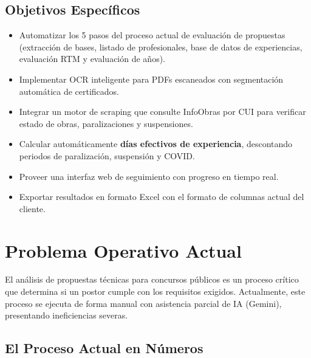 \documentclass[11pt,a4paper]{article}
\begin{document}
\subsection{Objetivos Específicos}
\begin{itemize}[leftmargin=*,noitemsep]
    \item Automatizar los 5 pasos del proceso actual de evaluación de propuestas (extracción de bases, listado de profesionales, base de datos de experiencias, evaluación RTM y evaluación de años).
    \item Implementar OCR inteligente para PDFs escaneados con segmentación automática de certificados.
    \item Integrar un motor de scraping que consulte InfoObras por CUI para verificar estado de obras, paralizaciones y suspensiones.
    \item Calcular automáticamente \textbf{días efectivos de experiencia}, descontando periodos de paralización, suspensión y COVID.
    \item Proveer una interfaz web de seguimiento con progreso en tiempo real.
    \item Exportar resultados en formato Excel con el formato de columnas actual del cliente.
\end{itemize}

\section{Problema Operativo Actual}

El análisis de propuestas técnicas para concursos públicos es un proceso crítico que determina si un postor cumple con los requisitos exigidos. Actualmente, este proceso se ejecuta de forma manual con asistencia parcial de IA (Gemini), presentando ineficiencias severas.

\subsection{El Proceso Actual en Números}
\end{document}
